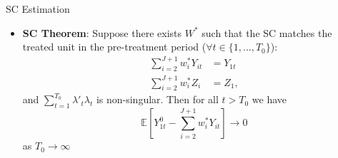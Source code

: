 \documentclass[hyperref={pdfpagelabels=false}]{beamer}
\begin{document}
\begin{frame}{SC Estimation}
\begin{itemize}
\item \textbf{SC Theorem}: Suppose there exists $W^*$ such that the SC matches the treated unit in the pre-treatment period ($\forall t\in\{1,...,T_0\}$): 
\begin{align*}
\sum^{J+1}_{i=2}w^*_{i}Y_{it}&=Y_{1t} \\
\sum^{J+1}_{i=2}w^*_{i}Z_i&=Z_1,
\end{align*}
and $\sum^{T_0}_{t=1}\lambda'_t\lambda_t$ is non-singular. Then for all $t>T_0$ we have
\begin{equation*}
\mathbb{E}\left[Y^0_{1t}-\sum^{J+1}_{i=2}w^*_{i}Y_{it}\right]\rightarrow 0
\end{equation*}
as $T_0\rightarrow\infty$ 

\end{itemize}
\end{frame}
\end{document}
